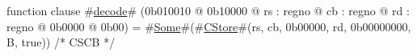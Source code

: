 function clause #\hyperref[zdecode]{decode}# (0b010010 @ 0b10000 @ rs : regno @ cb : regno @ rd : regno @ 0b0000 @ 0b00) = #\hyperref[zSome]{Some}#(#\hyperref[zCStore]{CStore}#(rs, cb, 0b00000, rd, 0b00000000, B, true)) /* CSCB */
